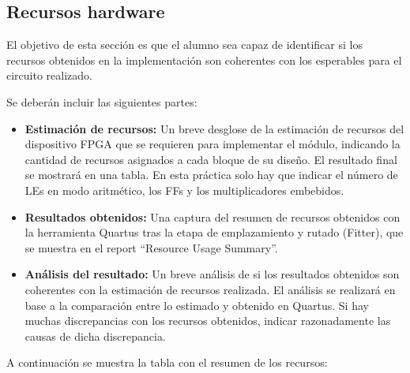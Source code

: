 \documentclass[parskip,a4paper,12pt]{article}
\begin{document}


\subsection{Recursos hardware}
\begin{enunciado}{}{}%
El objetivo de esta sección es que el alumno sea capaz de identificar si los recursos obtenidos en la implementación son coherentes con los esperables para el circuito realizado.

Se deberán incluir las siguientes partes: 
\begin{itemize}
\item \textbf{Estimación de recursos:} Un breve desglose de la estimación de recursos  del dispositivo FPGA que se requieren para implementar el módulo, indicando la cantidad de recursos asignados a cada bloque de su diseño. El resultado final se mostrará en una tabla. En esta práctica solo hay que indicar el número de LEs en modo aritmético, los FFs y los multiplicadores embebidos. 

\item \textbf{Resultados obtenidos:} Una captura del resumen de recursos obtenidos con la herramienta Quartus tras la etapa de emplazamiento y rutado (Fitter), que se muestra en el report ``Resource Usage Summary''.  

\item \textbf{Análisis del resultado:} Un breve análisis de si los resultados obtenidos son coherentes con la estimación de recursos realizada. El análisis se realizará en base a la comparación entre lo estimado y obtenido en Quartus. Si hay muchas discrepancias con los recursos obtenidos, indicar razonadamente las causas de dicha discrepancia.
\end{itemize}

\end{enunciado}
A continuación se muestra la tabla con el resumen de los recursos:


\def\colUNO{5.5 cm}
\def\colDOS{5 cm}
\def\colTRES{5 cm}
\end{document}
